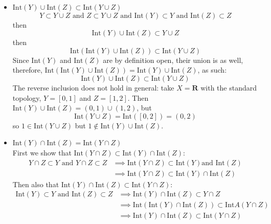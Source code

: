 \documentclass{article} %
\begin{document}
\begin{itemize}
    \begin{align*}
      Y \cap Z \subset Y \text{ and } Y \cap Z \subset Z &\implies
      \overline{(Y \cap Z)} \subset \overline Y \text{ and } \\
      &\implies \overline{Y \cap Z} \subset \overline Y \cap \overline Z
    \end{align*}
    The reverse inclusion does not hold in general: take $X = \mathbf{R}$
    with the standard topology, $Y = (0,1)$ and $Z = (1,2)$. Then $Y \cap
    Z = \emptyset$, so $\overline{Y \cap Z} = \emptyset$, but
    \[
      \overline Y \cap \overline Z = [0,1] \cap [1,2] = \{1\}
      \not\subset \emptyset = \overline{Y \cap Z}
    \]
  \item $\text{Int}(Y) \cup \text{Int}(Z) \subset \text{Int}(Y \cup Z)$\\
    \[
      Y \subset Y \cup Z \text{ and } Z \subset Y \cup Z \text{ and }
      \text{Int}(Y) \subset Y \text{ and } \text{Int}(Z) \subset Z
    \]
    then
    \[
      \text{Int}(Y) \cup \text{Int}(Z) \subset Y \cup Z
    \]
    then
    \[
      \text{Int}(\text{Int}(Y) \cup  \text{Int}(Z)) \subset \text{Int}(Y \cup Z)
    \]
    Since $\text{Int}(Y)$ and $\text{Int}(Z)$ are by definition open,
    their union is as well, therefore, $\text{Int}(\text{Int}(Y) \cup
    \text{Int}(Z)) = \text{Int}(Y) \cup \text{Int}(Z)$, as such:
    \[
      \text{Int}(Y) \cup  \text{Int}(Z) \subset \text{Int}(Y \cup Z)
    \]
    The reverse inclusion does not hold in general: take $X = \mathbf{R}$
    with the standard topology, $Y = [0,1]$ and $Z = [1,2]$. Then
    $\text{Int}(Y) \cup \text{Int}(Z) = (0,1) \cup (1,2)$, but
    \[
      \text{Int}(Y \cup Z) = \text{Int}([0,2]) = (0,2)
    \]
    so $1 \in \text{Int}(Y \cup Z)$ but $1 \notin \text{Int}(Y) \cup
    \text{Int}(Z)$.
  \item $\text{Int}(Y) \cap \text{Int}(Z) = \text{Int}(Y\cap Z)$ \\
    First we show that $\text{Int}(Y\cap Z) \subset \text{Int}(Y)
    \cap \text{Int}(Z)$:
    \begin{align*}
      Y \cap Z  \subset Y  \text{ and } Y \cap Z  \subset Z
      &\implies  \text{Int}(Y \cap Z) \subset \text{Int}(Y) \text{
      and } \text{Int}(Z) \\
      &\implies \text{Int}(Y \cap Z)\subset \text{Int}(Y) \cap \text{Int}(Z)
    \end{align*}
    Then also that $\text{Int}(Y) \cap \text{Int}(Z) \subset
    \text{Int}(Y \cap Z)$:
    \begin{align*}
      \text{Int}(Y) \subset Y \text{ and } \text{Int}(Z) \subset Z
      &\implies \text{Int}(Y) \cap \text{Int}(Z) \subset Y \cap Z \\
      &\implies \text{Int}(\text{Int}(Y) \cap \text{Int}(Z)) \subset
      \text{Int}A(Y \cap Z) \\
      &\implies \text{Int}(Y) \cap \text{Int}(Z) \subset \text{Int}(Y \cap Z)
    \end{align*}

\end{itemize}
\end{document}
